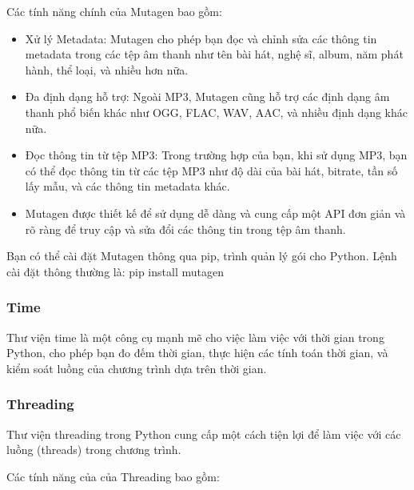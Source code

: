 \documentclass[a4paper]{article}
\begin{document}
      \hspace*{0.5cm} Các tính năng chính của Mutagen bao gồm:
      \begin{itemize}
          \item Xử lý Metadata: Mutagen cho phép bạn đọc và chỉnh sửa các thông tin metadata trong các tệp âm thanh như tên bài hát, nghệ sĩ, album, năm phát hành, thể loại, và nhiều hơn nữa.
          \item Đa định dạng hỗ trợ: Ngoài MP3, Mutagen cũng hỗ trợ các định dạng âm thanh phổ biến khác như OGG, FLAC, WAV, AAC, và nhiều định dạng khác nữa.
          \item Đọc thông tin từ tệp MP3: Trong trường hợp của bạn, khi sử dụng MP3, bạn có thể đọc thông tin từ các tệp MP3 như độ dài của bài hát, bitrate, tần số lấy mẫu, và các thông tin metadata khác.
          \item Mutagen được thiết kế để sử dụng dễ dàng và cung cấp một API đơn giản và rõ ràng để truy cập và sửa đổi các thông tin trong tệp âm thanh.
      \end{itemize}  

      \hspace*{0.5cm} Bạn có thể cài đặt Mutagen thông qua pip, trình quản lý gói cho Python. Lệnh cài đặt thông thường là: pip install mutagen
      
\subsubsection{Time}
     \hspace*{0.5cm} Thư viện time là một công cụ mạnh mẽ cho việc làm việc với thời gian trong Python, cho phép bạn đo đếm thời gian, thực hiện các tính toán thời gian, và kiểm soát luồng của chương trình dựa trên thời gian.
     
\subsubsection{Threading}
     \hspace*{0.5cm} Thư viện threading trong Python cung cấp một cách tiện lợi để làm việc với các luồng (threads) trong chương trình.

     \hspace*{0.5cm} Các tính năng của của Threading bao gồm:
\end{document}
